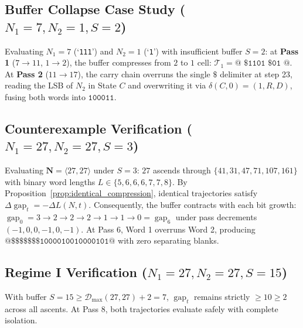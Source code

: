 \documentclass[journal,10pt,twocolumn]{IEEEtran}
\DeclareMathOperator{\gap}{gap}
\begin{document}
\subsection{Buffer Collapse Case Study \texorpdfstring{($N_1 = 7, N_2 = 1, S = 2$)}{(N1=7, N2=1, S=2)}}
Evaluating $N_1 = 7$ (`\texttt{111}') and $N_2 = 1$ (`\texttt{1}') with insufficient buffer $S = 2$: at \textbf{Pass 1} ($7 \to 11$, $1 \to 2$), the buffer compresses from $2$ to $1$ cell: $\mathcal{T}_1 = \texttt{@ \$ 1101 \$ 01 @}$. At \textbf{Pass 2} ($11 \to 17$), the carry chain overruns the single $\$$ delimiter at step 23, reading the LSB of $N_2$ in State $C$ and overwriting it via $\delta(C, 0) = (1, R, D)$, fusing both words into $\texttt{100011}$.

\subsection{Counterexample Verification \texorpdfstring{($N_1 = 27, N_2 = 27, S = 3$)}{(N1=27, N2=27, S=3)}}
Evaluating $\mathbf{N} = \langle 27, 27 \rangle$ under $S = 3$: $27$ ascends through $\{41, 31, 47, 71, 107, 161\}$ with binary word lengths $L \in \{5, 6, 6, 6, 7, 7, 8\}$. By Proposition~\ref{prop:identical_compression}, identical trajectories satisfy $\Delta \gap_t = -\Delta L(N, t)$. Consequently, the buffer contracts with each bit growth: $\gap_0 = 3 \to 2 \to 2 \to 2 \to 1 \to 1 \to 0 = \gap_6$ under pass decrements $(-1, 0, 0, -1, 0, -1)$. At Pass 6, Word 1 overruns Word 2, producing $\texttt{@\$\$\$\$\$\$\$1000010010000101@}$ with zero separating blanks.

\subsection{Regime I Verification \texorpdfstring{($N_1 = 27, N_2 = 27, S = 15$)}{(N1=27, N2=27, S=15)}}
With buffer $S = 15 \ge \mathcal{D}_{\max}(27, 27) + 2 = 7$, $\gap_t$ remains strictly $\ge 10 \ge 2$ across all ascents. At Pass 8, both trajectories evaluate safely with complete isolation.
\end{document}
